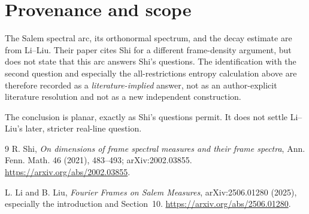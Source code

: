 \documentclass[11pt]{article}
\begin{document}
\section*{Provenance and scope}

The Salem spectral arc, its orthonormal spectrum, and the decay estimate are
from Li--Liu.  Their paper cites Shi for a different frame-density argument,
but does not state that this arc answers Shi's questions.  The identification
with the second question and especially the all-restrictions entropy
calculation above are therefore recorded as a \emph{literature-implied}
answer, not as an author-explicit literature resolution and not as a new
independent construction.

The conclusion is planar, exactly as Shi's questions permit.  It does not
settle Li--Liu's later, stricter real-line question.

\begin{thebibliography}{9}
R. Shi,
\emph{On dimensions of frame spectral measures and their frame spectra},
Ann. Fenn. Math. 46 (2021), 483--493; arXiv:2002.03855.
\url{https://arxiv.org/abs/2002.03855}.

L. Li and B. Liu,
\emph{Fourier Frames on Salem Measures},
arXiv:2506.01280 (2025), especially the introduction and Section~10.
\url{https://arxiv.org/abs/2506.01280}.
\end{thebibliography}
\end{document}
